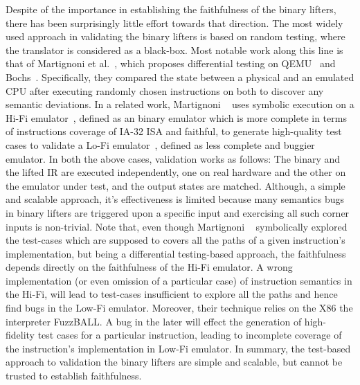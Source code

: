 Despite of the importance in establishing the faithfulness of the binary
lifters, there has been surprisingly little effort towards that direction.
%
The most widely used approach in validating the binary lifters is based on
random testing, where the translator is considered as a black-box. Most notable
work along this line  is that of Martignoni et al.~\cite{Martignoni:ISSTA2009,
  Martignoni:ISSTA2010}, which proposes differential testing on
  QEMU~\cite{QEMU:USENIX05} and Bochs~\cite{Bochs1996}.  Specifically, they
  compared the state between a physical and an emulated CPU after executing
  randomly chosen instructions on both to discover any semantic deviations. In
  a related work, Martignoni \etal~\cite{Martignoni:ASPLOS2012} uses symbolic
  execution on a Hi-Fi emulator~\cite{Bochs1996}, defined as an binary emulator
  which is more complete in terms of instructions coverage of IA-32 ISA and
  faithful, to generate high-quality test cases to validate  a Lo-Fi
  emulator~\cite{QEMU:USENIX05}, defined as  less complete and buggier
  emulator. In both the above cases, validation works as follows: The binary
  and the lifted IR are executed independently, one on real hardware and the
  other on the emulator under test, and the output states are matched.
  Although, a simple and scalable approach, it's effectiveness is limited
  because many semantics bugs in binary lifters are triggered upon a specific
  input and exercising all such corner inputs is non-trivial. Note that, even
  though Martignoni \etal~\cite{Martignoni:ASPLOS2012} symbolically explored
  the test-cases which are supposed to covers all the paths of a given
  instruction's implementation, but being a differential testing-based
  approach, the faithfulness depends directly on  the faithfulness of the Hi-Fi
  emulator. A wrong implementation (or even omission of a particular case) of
  instruction semantics in the Hi-Fi, will lead to test-cases insufficient to
  explore all the paths and hence find bugs in the Low-Fi emulator. Moreover,
  their technique relies on the X86 the interpreter FuzzBALL. A bug in the
  later will effect the generation of high-fidelity test cases for a particular
  instruction, leading to incomplete coverage of the instruction's
  implementation in Low-Fi emulator. In summary, the test-based approach to
  validation the binary lifters are simple and scalable, but cannot be trusted
  to establish faithfulness.     

